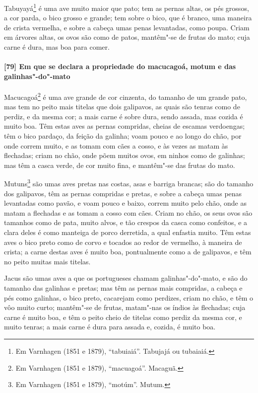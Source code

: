 \begin{linenumbers}
Tabuyayá\footnote{ Em Varnhagen (1851 e 1879), ``tabuiaiá''. Tabujajá ou tubaiaiá.} é uma
ave muito maior que pato; tem as pernas altas, os pés grossos, a cor parda, o bico grosso
e grande; tem sobre o bico, que é branco, uma maneira de crista vermelha, e sobre a cabeça
umas penas levantadas, como poupa. Criam em árvores altas, os ovos são como de patos,
mantêm"-se de frutas do mato; cuja carne é dura, mas boa para comer.

\paragraph{[79] Em que se declara a propriedade do macucagoá, motum e das galinhas"-do"-mato}\quad
Macucagoá\footnote{ Em Varnhagen (1851 e 1879), ``macuagoá''. Macaguã.} é uma ave grande
de cor cinzenta, do tamanho de um grande pato, mas tem no peito mais titelas que dois
galipavos, as quais são tenras como de perdiz, e da mesma cor; a mais carne é sobre dura,
sendo assada, mas cozida é muito boa. Têm estas aves as
pernas compridas, cheias de escamas verdoengas; têm o bico pardaço, da feição da galinha;
voam pouco e ao longo do chão, por onde correm muito, e as tomam com cães a cosso, e às
vezes as matam às flechadas; criam no chão, onde põem muitos ovos, em ninhos como de
galinhas; mas têm a casca verde, de cor muito fina, e mantêm"-se das frutas do mato.

Mutuns\footnote{ Em Varnhagen (1851 e 1879), ``motúm''. Mutum.} são umas aves pretas nas
costas, asas e barriga brancas; são do tamanho dos galipavos, têm as pernas compridas e
pretas, e sobre a cabeça umas penas levantadas como pavão, e voam pouco e baixo, correm
muito pelo chão, onde as matam a flechadas e as tomam a cosso com cães. Criam no chão, os
seus ovos são tamanhos como de pata, muito alvos, e tão crespos da casca como confeitos, e
a clara deles é como manteiga de porco derretida, a qual enfastia muito. Têm estas aves o
bico preto como de corvo e tocados ao redor de vermelho, à maneira de crista; a carne
destas aves é muito boa, pontualmente como a de galipavos, e têm no peito muitas mais
titelas.

Jacus são umas aves a que os portugueses chamam galinhas"-do"-mato, e são do tamanho das
galinhas e pretas; mas têm as pernas mais compridas, a cabeça e pés como galinhas, o bico
preto, cacarejam como perdizes, criam no chão, e têm o vôo muito curto; mantêm"-se de
frutas, matam"-nas os índios às flechadas; cuja carne é muito boa, e têm o peito cheio de
titelas como perdiz da mesma cor, e muito tenras; a mais carne é dura para assada e,
cozida, é muito boa.


\end{linenumbers}
